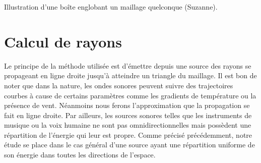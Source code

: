 \begin{figureth}
\begin{subfigureth}{0.35\textwidth}
		\label{boîteenglobante2}
	\end{subfigureth}
	\caption{Illustration d'une boîte englobant un maillage quelconque (Suzanne).}
\end{figureth}


\section{Calcul de rayons} \label{sect_rayon}


Le principe de la méthode utilisée est d'émettre depuis une source des rayons se propageant en ligne droite jusqu'à atteindre un triangle du maillage. Il est bon de noter que dans la nature, les ondes sonores peuvent suivre des trajectoires courbes à cause de certains paramètres comme les gradients de température ou la présence de vent. Néanmoins nous ferons l'approximation que la propagation se fait en ligne droite. Par ailleurs, les sources sonores telles que les instruments de musique ou la voix humaine ne sont pas omnidirectionnelles mais possèdent une répartition de l'énergie qui leur est propre. Comme précisé précédemment, notre étude se place dans le cas général d'une source ayant une répartition uniforme de son énergie dans toutes les directions de l'espace.

